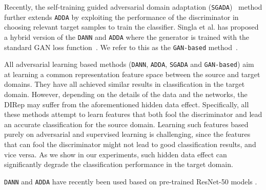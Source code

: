 \documentclass{article}
\newcommand\todo[1]{\textcolor{red}{#1}}
\newcommand{\elisa}[1]{\textbf{\color{red}Elisa: #1}}
\begin{document}
Recently, the self-training guided adversarial domain adaptation (\verb"SGADA")~\cite{akkaya2021self} method further extends \verb"ADDA" by exploiting the performance of the discriminator in choosing relevant target samples to train the classifier. %
Singla et al. has proposed a hybrid version of the \verb"DANN" and \verb"ADDA" where the generator is trained with the standard GAN loss function~\cite{goodfellow2020generative}. We refer to this  as the \verb"GAN-based" method~\cite{singla2020preparing}.

All adversarial learning based methods (\verb"DANN", \verb"ADDA", \verb"SGADA" and \verb"GAN-based") aim at learning a common representation feature space between the source and target domains. They have all achieved similar results in classification in the target domain. 
However, depending on the details of the data and the networks, the DIRep may suffer from the aforementioned  hidden data effect. Specifically, all these methods attempt to learn features that both fool the discriminator and lead an accurate classification for the source domain. Learning such features based purely on adversarial and supervised learning is challenging, since the features that can fool the discriminator might not lead to good classification results, and vice versa. 
As we show in our experiments, such hidden data effect can significantly degrade the classification performance in the target domain. 

\verb"DANN" and \verb"ADDA" have recently been used based on pre-trained ResNet-50 models \cite{chen2020adversarial}.
\end{document}
